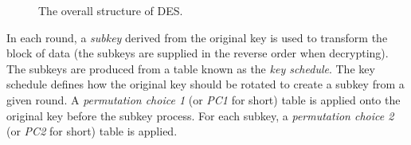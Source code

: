 \begin{figure}[H]
    \caption{The overall structure of DES.}
\end{figure}

In each round, a \textit{subkey} derived from the original key is used to transform the block of data (the subkeys are supplied in the reverse order when decrypting).
The subkeys are produced from a table known as the \textit{key schedule}. The key schedule defines how the original key should be rotated to create a subkey from a given
round. A \textit{permutation choice 1} (or \textit{PC1} for short) table is applied onto the original key before the subkey process. For each subkey, a \textit{permutation
choice 2} (or \textit{PC2} for short) table is applied.

